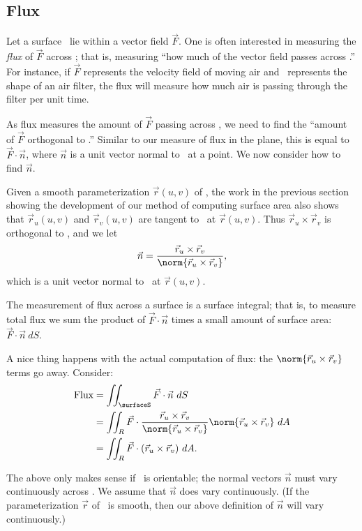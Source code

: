 \subsection{Flux}

Let a surface \surfaceS\ lie within a vector field $\vec F$. One is often interested in measuring the \emph{flux} of $\vec F$ across \surfaceS; that is, measuring ``how much of the vector field passes across \surfaceS.'' For instance, if $\vec F$ represents the velocity field of moving air and \surfaceS\ represents the shape of an air filter, the flux will measure how much air is passing through the filter per unit time.

As flux measures the amount of $\vec F$ passing across \surfaceS, we need to find the ``amount of $\vec F$ orthogonal to \surfaceS.'' Similar to our measure of flux in the plane, this is equal to $\vec F\cdot \vec n$, where $\vec n$ is a unit vector normal to \surfaceS\ at a point. We now consider how to find $\vec n$.

Given a smooth parameterization $\vec r(u,v)$ of \surfaceS, the work in the previous section showing the development of our method of computing surface area also shows that $\vec r_u(u,v)$ and $\vec r_v(u,v)$ are tangent to \surfaceS\ at $\vec r(u,v)$. Thus $\vec r_u\times \vec r_v$ is orthogonal to \surfaceS, and we let
\[\vec n = \frac{\vec r_u\times \vec r_v}{\norm{\vec r_u\times \vec r_v}},\]
which is a unit vector normal to \surfaceS\ at $\vec r(u,v)$.

The measurement of flux across a surface is a surface integral; that is, to measure total flux we sum the product of $\vec F\cdot\vec n$ times a small amount of surface area: $\vec F\cdot \vec n\ dS$. 

A nice thing happens with the actual computation of flux: the $\norm{\vec r_u\times \vec r_v}$ terms go away. Consider:
\begin{align*}
	\text{Flux}
	&= \iint_\surfaceS \vec F\cdot \vec n\ dS \\
	&= \iint_R \vec F\cdot \frac{\vec r_u\times \vec r_v}{\norm{\vec r_u\times \vec r_v}}\norm{\vec r_u\times \vec r_v}\ dA \\
	&= \iint_R \vec F\cdot (\vec r_u\times \vec r_v)\ dA.
\end{align*}

The above only makes sense if \surfaceS\ is orientable; the normal vectors $\vec n$ must vary continuously across \surfaceS. We assume that $\vec n$ does vary continuously. (If the parameterization $\vec r$ of \surfaceS\ is smooth, then our above definition of $\vec n$ will vary continuously.)

